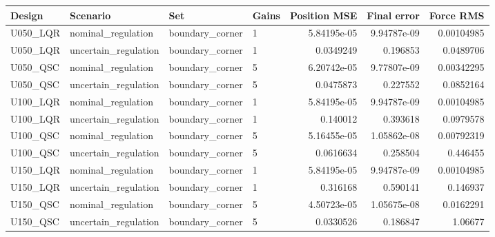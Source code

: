\begin{tabular}{llllrrr}
\hline
Design & Scenario & Set & Gains & Position MSE & Final error & Force RMS \\
\hline
U050\_LQR & nominal\_regulation & boundary\_corner & 1 & 5.84195e-05 & 9.94787e-09 & 0.00104985 \\
U050\_LQR & uncertain\_regulation & boundary\_corner & 1 & 0.0349249 & 0.196853 & 0.0489706 \\
U050\_QSC & nominal\_regulation & boundary\_corner & 5 & 6.20742e-05 & 9.77807e-09 & 0.00342295 \\
U050\_QSC & uncertain\_regulation & boundary\_corner & 5 & 0.0475873 & 0.227552 & 0.0852164 \\
U100\_LQR & nominal\_regulation & boundary\_corner & 1 & 5.84195e-05 & 9.94787e-09 & 0.00104985 \\
U100\_LQR & uncertain\_regulation & boundary\_corner & 1 & 0.140012 & 0.393618 & 0.0979578 \\
U100\_QSC & nominal\_regulation & boundary\_corner & 5 & 5.16455e-05 & 1.05862e-08 & 0.00792319 \\
U100\_QSC & uncertain\_regulation & boundary\_corner & 5 & 0.0616634 & 0.258504 & 0.446455 \\
U150\_LQR & nominal\_regulation & boundary\_corner & 1 & 5.84195e-05 & 9.94787e-09 & 0.00104985 \\
U150\_LQR & uncertain\_regulation & boundary\_corner & 1 & 0.316168 & 0.590141 & 0.146937 \\
U150\_QSC & nominal\_regulation & boundary\_corner & 5 & 4.50723e-05 & 1.05675e-08 & 0.0162291 \\
U150\_QSC & uncertain\_regulation & boundary\_corner & 5 & 0.0330526 & 0.186847 & 1.06677 \\
\hline
\end{tabular}
